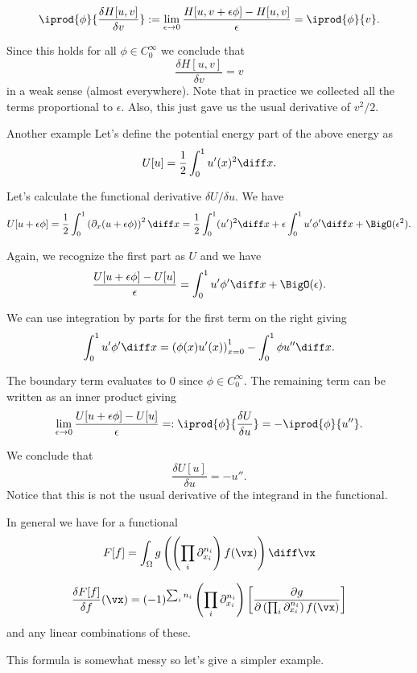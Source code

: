 \begin{frame}
	\[ \iprod{\phi}{\frac{\delta H[u,v]}{\delta v}} :=  \lim_{\epsilon \to 0} \frac{H[u, v + \epsilon \phi] - H[u,v]}{\epsilon}  = \iprod{\phi}{v}.  \]
	
	\pause
	Since this holds for all $ \phi \in C_0^\infty $ we conclude that 
	\[ \frac{\delta H[u,v]}{\delta v} = v \]
	in a weak sense (almost everywhere).
	Note that in practice we collected all the terms proportional to $ \epsilon $. Also, this just gave us the usual derivative of $ v^2/2 $.
\end{frame}

\begin{frame}{Another example}
	Let's define the potential energy part of the above energy as 
	\[ U[u] = \frac{1}{2} \int_{0}^1 u'(x)^2 \diff x.  \]
	
	\pause
	Let's calculate the functional derivative $ \delta U/ \delta u $. We have 
	\[ U[u + \epsilon \phi] = \frac{1}{2}\int_0^1 \left(\partial_x (u + \epsilon \phi)  \right)^2 \diff x  
	= \frac{1}{2} \int_0^1 (u')^2 \diff x + \epsilon  \int_0^1 u' \phi' \diff x + \BigO(\epsilon^2).
	\]
	
	\pause
	Again, we recognize the first part as $ U $ and we have 
	\[ \frac{U[u + \epsilon \phi] - U[u]}{\epsilon} = \int_{0}^1 u' \phi' \diff x + \BigO(\epsilon).  \]
	
\end{frame}

\begin{frame}
	We can use integration by parts for the first term on the right giving
	\[ \int_{0}^1 u' \phi' \diff x = \left(\phi(x) u'(x)  \right)_{x=0}^{1} - \int_{0}^1 \phi u''  \diff x. \]
	
	\pause
	The boundary term evaluates to 0 since $ \phi \in C_0^\infty $. The remaining term can be written as an inner product giving 
	\[ \lim_{\epsilon \to 0}\frac{U[u + \epsilon \phi] - U[u]}{\epsilon} =: \iprod{\phi}{\frac{\delta U}{\delta u}} = -\iprod{\phi}{u''}. \]
	
	\pause
	We conclude that 
	\[ \frac{\delta U[u]}{\delta u} = -u''.\]
	Notice that this is not the usual derivative of the integrand in the functional. 
\end{frame}

\begin{frame}
	In general we have for a functional
	\[ F[f] = \int_\Omega g\left( \left( \prod_i \partial_{x_i}^{n_i} \right) f(\vx) \right) \diff \vx \]
	
	\pause
	\[ \frac{\delta F[f]}{\delta f}(\vx) =  (-1)^{\sum_i n_i} \left(\prod_i \partial_{x_i}^{n_i} \right) \left[  \frac{\partial g}{\partial \left( \prod_i \partial_{x_i}^{n_i} \right) f(\vx) } \right] \]
	and any linear combinations of these.
	
	This formula is somewhat messy so let's give a simpler example. 
\end{frame}

